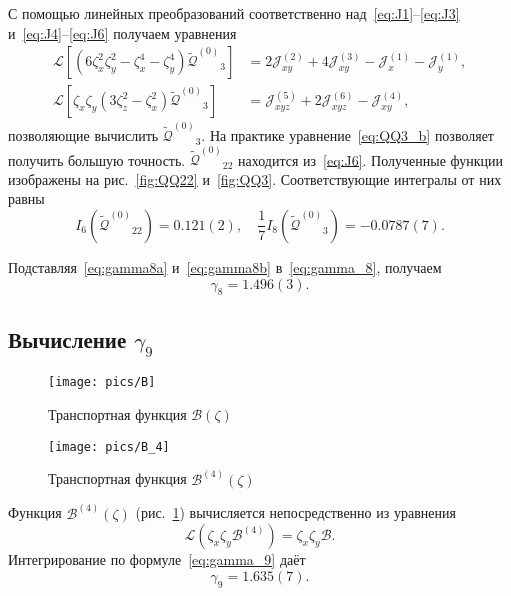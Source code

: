 \documentclass[a4paper,12pt]{article}
\newcommand{\B}{\ensuremath{\mathcal{B}^{(4)}}}
\newcommand{\QQ}{\ensuremath{\tilde{\mathcal{Q}}^{(0)}}}
\begin{document}
С помощью линейных преобразований соответственно над~\eqref{eq:J1}--\eqref{eq:J3} и~\eqref{eq:J4}--\eqref{eq:J6}
получаем уравнения
\begin{align}
    \mathcal{L}\left[ \left( 6\zeta_x^2\zeta_y^2 - \zeta_x^4 - \zeta_y^4 \right)\QQ_3 \right]
        &= 2\mathcal{J}_{xy}^{(2)} + 4\mathcal{J}_{xy}^{(3)} - \mathcal{J}_{x}^{(1)} - \mathcal{J}_{y}^{(1)}, \label{eq:QQ3_a}\\
    \mathcal{L}\left[ \zeta_x\zeta_y\left( 3\zeta_z^2 - \zeta_x^2 \right)\QQ_3 \right]
        &= \mathcal{J}_{xyz}^{(5)} + 2\mathcal{J}_{xyz}^{(6)} - \mathcal{J}_{xy}^{(4)}, \label{eq:QQ3_b}
\end{align}
позволяющие вычислить \(\QQ_3\).
На практике уравнение~\eqref{eq:QQ3_b} позволяет получить большую точность.
\(\QQ_{22}\) находится из~\eqref{eq:J6}.
Полученные функции изображены на рис.~\ref{fig:QQ22} и~\ref{fig:QQ3}.
Соответствующие интегралы от них равны
\begin{equation}\label{eq:gamma8b}
    I_6\left(\QQ_{22}\right) = 0.121(2), \quad \frac17 I_8\left(\QQ_3\right) = -0.0787(7).
\end{equation}

Подставляя~\eqref{eq:gamma8a} и~\eqref{eq:gamma8b} в~\eqref{eq:gamma_8}, получаем
\begin{equation}\label{eq:gamma_8_result}
    \gamma_8 = 1.496(3).
\end{equation}

\subsection{Вычисление \texorpdfstring{$\gamma_9$}{gamma9}}

\begin{figure}
    \centering
    \begin{minipage}[b]{0.5\textwidth}
        \centering
        \texttt{[image: pics/B]}
        \caption{Транспортная функция \(\mathcal{B}(\zeta)\)}
        \label{fig:B}
    \end{minipage}%
    \begin{minipage}[b]{0.5\textwidth}
        \centering
        \texttt{[image: pics/B\_4]}
        \caption{Транспортная функция \(\B(\zeta)\)}
        \label{fig:B_4}
    \end{minipage}
\end{figure}

Функция \(\B(\zeta)\) (рис.~\ref{fig:B_4}) вычисляется непосредственно из уравнения
\begin{equation}\label{eq:B_4_par}
    \mathcal{L}\left(\zeta_x\zeta_y\B\right) = \zeta_x\zeta_y\mathcal{B}.
\end{equation}
Интегрирование по формуле~\eqref{eq:gamma_9} даёт
\begin{equation}\label{eq:gamma_9_result}
    \gamma_9 = 1.635(7).
\end{equation}
\end{document}
